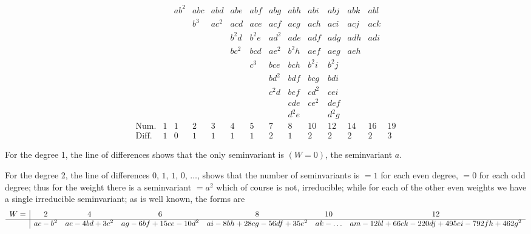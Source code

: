 \documentclass[11pt,a4paper]{article}
\providecommand{\textsc}[1]{{\scshape #1}}
\begin{document}
\[\begin{array}{r|ccccccccccccc}
               &       & ab^{2} & abc & abd & abe & abf & abg & abh & abi & abj & abk & abl\\
               &       &        & b^{3} & ac^{2} & acd & ace & acf & acg & ach & aci & acj & ack\\
               &       &        &       &        & b^{2}d & b^{2}e & ad^{2} & ade & adf & adg & adh & adi\\
               &       &        &       &        & bc^{2} & bcd & ae^{2} & b^{2}h & aef & aeg & aeh\\
               &       &        &       &        &        & c^{3} & bce    & bch    & b^{2}i & b^{2}j\\
               &       &        &       &        &        &       & bd^{2} & bdf    & bcg    & bdi\\
               &       &        &       &        &        &       & c^{2}d & bef    & cd^{2} & cei\\
               &       &        &       &        &        &       &        & cde    & ce^{2} & def\\
               &       &        &       &        &        &       &        & d^{2}e &        & d^{2}g\\
\text{Num.}    & 1 & 1 & 2 & 3 & 4 & 5 & 7 & 8 & 10 & 12 & 14 & 16 & 19\\
\text{Diff.}   & 1 & 0 & 1 & 1 & 1 & 1 & 2 & 1 & 2 & 2 & 2 & 2 & 3
\end{array}
\]
\clearpage

\fancyhead[L]{\small 801]}
\fancyhead[C]{\small\textsc{on seminvariants.}}

\thispagestyle{plain}
\noindent For the degree 1, the line of differences shows that the only seminvariant is $(W = 0)$, the seminvariant $a$.

\medskip
For the degree 2, the line of differences $0$, $1$, $1$, $0$, $\ldots$, shows that the number of seminvariants is $=1$ for each even degree, $=0$ for each odd degree; thus for the weight there is a seminvariant $= a^{2}$ which of course is not, irreducible; while for each of the other even weights we have a single irreducible seminvariant; as is well known, the forms are
\[
\begin{array}{r|ccccccc}
W = & 2 & 4 & 6 & 8 & 10 & 12\\\hline
    & ac-b^{2} & ae-4bd+3c^{2} & ag-6bf+15ce-10d^{2} & ai-8bh+28cg-56df+35e^{2} & ak-\ldots & am-12bl+66ck-220dj+495ei-792fh+462g^{2}
\end{array}
\]
\end{document}
